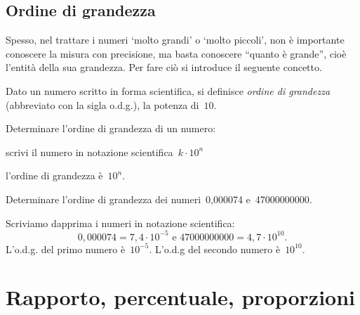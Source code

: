 
\subsection{Ordine di grandezza}

Spesso, nel trattare i numeri `molto grandi' o `molto piccoli', non è 
importante conoscere la misura con precisione, ma basta conoscere 
``quanto è grande'', cioè l'entità della sua grandezza. 
Per fare ciò si introduce il seguente concetto.

\begin{definizione}{}{}
Dato un numero scritto in forma scientifica, si definisce 
\emph{ordine di grandezza} (abbreviato con la sigla o.d.g.),
la potenza di~\(10\).
\end{definizione}

\begin{procedura}{}{}
Determinare l'ordine di grandezza di un numero:
\begin{enumeratea}
\item scrivi il numero in notazione scientifica~\({k\cdot10^n}\)
\item l'ordine di grandezza è~\(10^{n}\).
\end{enumeratea}
\end{procedura}


 \begin{esempio}{}{}
Determinare l'ordine di grandezza dei numeri~0,000074 e~47000000000.

Scriviamo dapprima i numeri in notazione scientifica:
\[0,000074=7,4\cdot 10^{-5}\text{ e }47000000000=4,7\cdot 10^{10}.\]
L'o.d.g. del primo numero è~\(10^{-5}\).
L'o.d.g del secondo numero è~\(10^{10}\).
 \end{esempio}


\section{Rapporto, percentuale, proporzioni}
\label{sec:razionali_rapporto}

